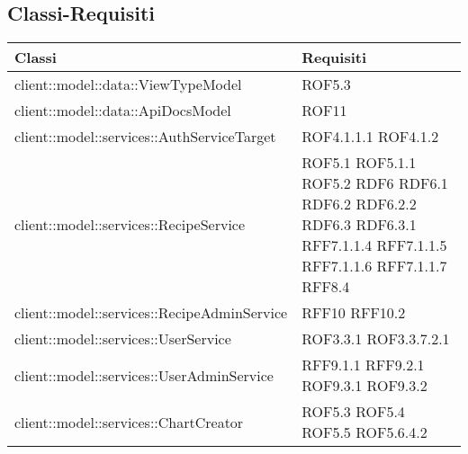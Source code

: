 \subsection{Classi-Requisiti} %
\label{sub:classi_requisiti}
\begin{center}
\def\arraystretch{1.5}
\bgroup
\begin{longtable}{| p{11cm} | p{2.5cm} |}
\hline
\textbf{Classi} & \textbf{Requisiti} \\
\hline
client::model::data::ViewTypeModel & ROF5.3 \\
\hline
client::model::data::ApiDocsModel & ROF11 \\
\hline
client::model::services::AuthServiceTarget & ROF4.1.1.1 \newline ROF4.1.2 \\
\hline
client::model::services::RecipeService & ROF5.1 \newline ROF5.1.1 \newline ROF5.2 \newline RDF6 \newline RDF6.1 \newline RDF6.2 \newline RDF6.2.2 \newline RDF6.3 \newline RDF6.3.1 \newline RFF7.1.1.4 \newline RFF7.1.1.5 \newline RFF7.1.1.6 \newline RFF7.1.1.7 \newline RFF8.4 \\
\hline
client::model::services::RecipeAdminService & RFF10 \newline RFF10.2 \\
\hline
client::model::services::UserService & ROF3.3.1 \newline ROF3.3.7.2.1 \\
\hline
client::model::services::UserAdminService & RFF9.1.1 \newline RFF9.2.1 \newline ROF9.3.1 \newline ROF9.3.2 \\
\hline
client::model::services::ChartCreator & ROF5.3 \newline ROF5.4 \newline ROF5.5 \newline ROF5.6.4.2 \\
\hline

\end{longtable}
\end{center}

